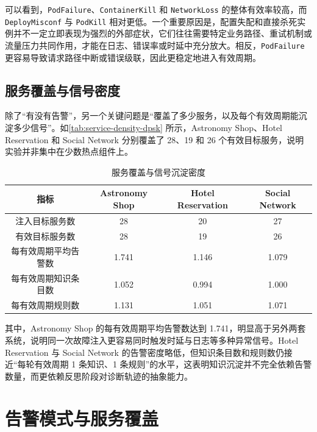 可以看到，\texttt{PodFailure}、\texttt{ContainerKill} 和 \texttt{NetworkLoss} 的整体有效率较高，而 \texttt{DeployMisconf} 与 \texttt{PodKill} 相对更低。一个重要原因是，配置失配和直接杀死实例并不一定立即表现为强烈的外部症状，它们往往需要特定业务路径、重试机制或流量压力共同作用，才能在日志、错误率或时延中充分放大。相反，\texttt{PodFailure} 更容易导致请求路径中断或错误级联，因此更稳定地进入有效周期。

\subsection{服务覆盖与信号密度}

除了“有没有告警”，另一个关键问题是“覆盖了多少服务，以及每个有效周期能沉淀多少信号”。如\autoref{tab:service-density-dpsk} 所示，Astronomy Shop、Hotel Reservation 和 Social Network 分别覆盖了 28、19 和 26 个有效目标服务，说明实验并非集中在少数热点组件上。

\begin{table}[htbp]
    \centering
    \caption{服务覆盖与信号沉淀密度}
    \label{tab:service-density-dpsk}
    \small
    \begin{tabular}{ c c c c}
        \toprule
        \textbf{指标} & \textbf{Astronomy Shop} & \textbf{Hotel Reservation} & \textbf{Social Network} \\
        \midrule
        注入目标服务数 & 28 & 20 & 27 \\
        有效目标服务数 & 28 & 19 & 26 \\
        每有效周期平均告警数 & 1.741 & 1.146 & 1.079 \\
        每有效周期知识条目数 & 1.052 & 0.994 & 1.000 \\
        每有效周期规则数 & 1.131 & 1.051 & 1.071 \\
        \bottomrule
    \end{tabular}
\end{table}

其中，Astronomy Shop 的每有效周期平均告警数达到 1.741，明显高于另外两套系统，说明同一次故障注入更容易同时触发时延与日志等多种异常信号。Hotel Reservation 与 Social Network 的告警密度略低，但知识条目数和规则数仍接近“每轮有效周期 1 条知识、1 条规则”的水平，这表明知识沉淀并不完全依赖告警数量，而更依赖反思阶段对诊断轨迹的抽象能力。

\section{告警模式与服务覆盖}
\label{sec:alert_patterns}

